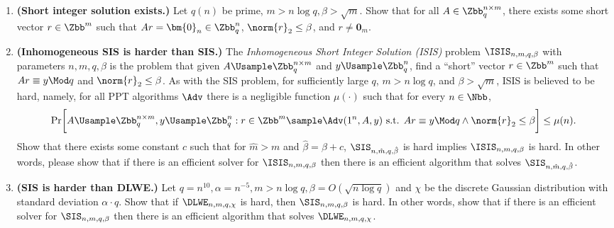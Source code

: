 \begin{problem}\label{p1}
    \leavevmode\par
    \begin{enumerate}[label=(\roman*)]
        \item \textbf{(Short integer solution exists.)} Let $q(n)$ be prime, $m\gt n\log q, \beta\gt\sqrt{m}$. Show that for all $A\in \Zbb_q^{n\times m}$, there exists some short vector $r\in\Zbb^m$ such that $Ar=\bm{0}_n\in\Zbb_q^n$, $\norm{r}_2\le \beta$, and $r\neq \bm{0}_m$.

        \item \textbf{(Inhomogeneous SIS is harder than SIS.)} The \textit{Inhomogeneous Short Integer Solution (ISIS)} problem $\ISIS_{n,m,q,\beta}$ with parameters $n,m,q,\beta$ is the problem that given $A\Usample \Zbb_q^{n\times m}$ and $y\Usample\Zbb_q^{n}$, find a ``short'' vector $r\in\Zbb^m$ such that $Ar \equiv y \Mod q$ and $\norm{r}_2\le \beta$. As with the SIS problem, for sufficiently large $q$, $m\gt n\log q$, and $\beta\gt \sqrt{m}$, ISIS is believed to be hard, namely, for all PPT algorithms $\Adv$ there is a negligible function $\mu(\cdot)$ such that for every $n\in\Nbb$,
        \[
            \Pr\biggl[A\Usample \Zbb_q^{n\times m}, y\Usample\Zbb_q^{n}: r\in\Zbb^m \sample \Adv(1^n, A, y) \textrm{ s.t. } Ar\equiv y\Mod q \land \norm{r}_2\le \beta \biggr] \le \mu(n).
        \]
        Show that there exists some constant $c$ such that for $\hat{m} \gt m$ and $\hat{\beta} = \beta + c$, $\SIS_{n, \hat{m},q, \hat{\beta}}$ is hard implies $\ISIS_{n,m,q,\beta}$ is hard. In other words, please show that if there is an efficient solver for $\ISIS_{n,m,q,\beta}$ then there is an efficient algorithm that solves $\SIS_{n, \hat{m},q, \hat{\beta}}$.

        \item \textbf{(SIS is harder than DLWE.)} Let $q = n^{10}, \alpha = n^{-5}, m \gt n \log q, \beta = O(\sqrt{n\log q})$ and $\chi$ be the discrete Gaussian distribution with standard deviation $\alpha\cdot q$. Show that if $\DLWE_{n,m,q,\chi}$ is hard, then $\SIS_{n,m,q,\beta}$ is hard. In other words,  show that if there is an efficient solver for $\SIS_{n,m,q,\beta}$ then there is an efficient algorithm that solves $\DLWE_{n,m,q,\chi}$.
    \end{enumerate}
\end{problem}


